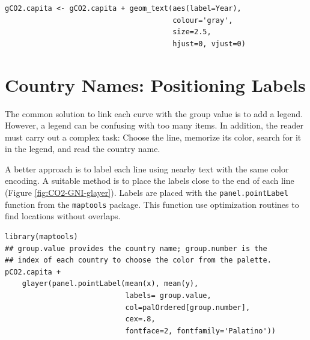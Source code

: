 \documentclass[smallroyalvopaper]{memoir}
\begin{document}
\lstset{language=R,numbers=none}
\begin{lstlisting}
gCO2.capita <- gCO2.capita + geom_text(aes(label=Year),
                                       colour='gray',
                                       size=2.5,
                                       hjust=0, vjust=0)
\end{lstlisting}
\section{Country Names: Positioning Labels}
\label{sec-4}
The common solution to link each curve with the group value is to add
a legend. However, a legend can be confusing with too many items. In
addition, the reader must carry out a complex task: Choose the line,
memorize its color, search for it in the legend, and read the country
name.

A better approach is to label each line using nearby text with the
same color encoding. A suitable method is to place the labels
close to the end of each line (Figure
\ref{fig:CO2-GNI-glayer}). Labels are placed with the
\texttt{panel.pointLabel} function from the \texttt{maptools} package. This
function use optimization routines to find locations without
overlaps.


\lstset{language=R,numbers=none}
\begin{lstlisting}
library(maptools)  
## group.value provides the country name; group.number is the
## index of each country to choose the color from the palette.
pCO2.capita +
    glayer(panel.pointLabel(mean(x), mean(y),
                            labels= group.value,
                            col=palOrdered[group.number],
                            cex=.8,
                            fontface=2, fontfamily='Palatino'))
\end{lstlisting}
\end{document}
